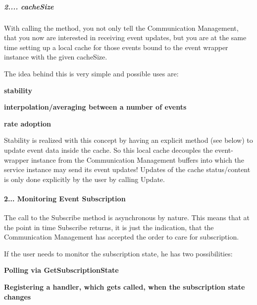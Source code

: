 \subparagraph*{2.... cache\+Size}


\begin{DoxyItemize}
\item With calling the method, you not only tell the Communication Management, that you now are interested in receiving event updates, but you are at the same time setting up a local cache for those events bound to the event wrapper instance with the given cache\+Size.
\item The idea behind this is very simple and possible uses are\+:
\begin{DoxyItemize}
\item {\bfseries stability}
\item {\bfseries interpolation/averaging between a number of events}
\item {\bfseries rate adoption}
\end{DoxyItemize}
\item Stability is realized with this concept by having an explicit method (see below) to update event data inside the cache. So this local cache decouples the event-\/wrapper instance from the Communication Management buffers into which the service instance may send its event updates! Updates of the cache status/content is only done explicitly by the user by calling Update.
\end{DoxyItemize}

\paragraph*{2... Monitoring Event Subscription}


\begin{DoxyItemize}
\item The call to the Subscribe method is asynchronous by nature. This means that at the point in time Subscribe returns, it is just the indication, that the Communication Management has accepted the order to care for subscription.
\item If the user needs to monitor the subscription state, he has two possibilities\+:
\begin{DoxyItemize}
\item {\bfseries Polling via Get\+Subscription\+State}
\item {\bfseries Registering a handler, which gets called, when the subscription state changes}
\end{DoxyItemize}
\end{DoxyItemize}

